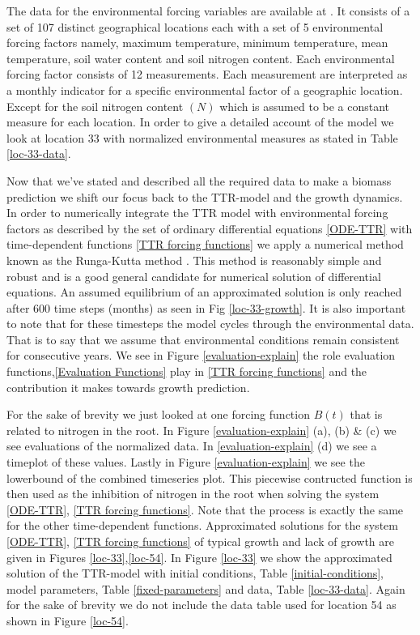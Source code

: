 \documentclass[paper=a4, fontsize=11pt]{scrartcl}
\numberwithin{equation}{section}		%
\numberwithin{figure}{section}			%
\numberwithin{table}{section}				%
\begin{document}
The data for the environmental forcing variables are available at \cite{DatabaseAristata}. It consists of a set of 107 distinct geographical locations each with a set of 5 environmental forcing factors namely, maximum temperature, minimum temperature, mean temperature, soil water content and soil nitrogen content. Each environmental forcing factor consists of 12 measurements. Each measurement are interpreted as a monthly indicator for a specific environmental factor of a geographic location. Except for the soil nitrogen content $(N)$ which is assumed to be a constant measure for each location. In order to give a detailed account of the model we look at location 33 with normalized environmental measures as stated in Table \ref{loc-33-data}. 


Now that we've stated and described all the required data to make a biomass prediction we shift our focus back to the TTR-model and the growth dynamics. In order to numerically integrate the TTR model with environmental forcing factors as described by the set of ordinary differential equations \ref{ODE-TTR} with time-dependent functions \ref{TTR forcing functions} we apply a numerical method known as the Runga-Kutta method \cite{HAIRER2000Solving1}. This method is reasonably simple and robust and is a good general candidate for numerical solution of differential equations. An assumed equilibrium of an approximated solution is only reached after 600 time steps (months) as seen in Fig \ref{loc-33-growth}.  It is also important to note that for these timesteps the model cycles through the environmental data. That is to say that we assume that environmental conditions remain consistent for consecutive years. We see in Figure \ref{evaluation-explain} the role evaluation functions,\ref{Evaluation Functions} play in \ref{TTR forcing functions} and the contribution it makes towards growth prediction. 



For the sake of brevity we just looked at one forcing function $B(t)$ that is related to nitrogen in the root. In Figure \ref{evaluation-explain} (a), (b) \& (c) we see evaluations of the normalized data. In \ref{evaluation-explain} (d) we see a timeplot of these values. Lastly in Figure \ref{evaluation-explain} we see the lowerbound of the combined timeseries plot. This piecewise contructed function is then used as the inhibition of nitrogen in the root when solving the system \ref{ODE-TTR}, \ref{TTR forcing functions}. Note that the process is exactly the same for the other time-dependent functions. Approximated solutions for the system \ref{ODE-TTR}, \ref{TTR forcing functions} of typical growth and lack of growth are given in Figures \ref{loc-33},\ref{loc-54}. In Figure \ref{loc-33} we show the approximated solution of the TTR-model with initial conditions, Table \ref{initial-conditions}, model parameters, Table \ref{fixed-parameters} and data, Table \ref{loc-33-data}. Again for the sake of brevity we do not include the data table used for location 54 as shown in Figure \ref{loc-54}. 
\end{document}
